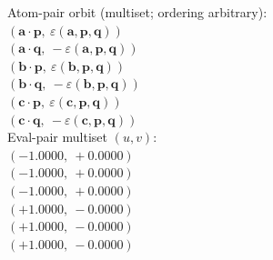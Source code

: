 \documentclass[a4paper,11pt]{article}
\newcommand{\pdcegfomjfhook}[2]{\mathbf{#1} \cdot \mathbf{#2}}
\newcommand{\kblbmcpggoncpf}[3]{\varepsilon(\mathbf{#1},\mathbf{#2},\mathbf{#3})}
\begin{document}
\quad Atom-pair orbit (multiset; ordering arbitrary):\\
$(\pdcegfomjfhook{a}{p},\ \kblbmcpggoncpf{a}{p}{q})$\\
$(\pdcegfomjfhook{a}{q},\ -\kblbmcpggoncpf{a}{p}{q})$\\
$(\pdcegfomjfhook{b}{p},\ \kblbmcpggoncpf{b}{p}{q})$\\
$(\pdcegfomjfhook{b}{q},\ -\kblbmcpggoncpf{b}{p}{q})$\\
$(\pdcegfomjfhook{c}{p},\ \kblbmcpggoncpf{c}{p}{q})$\\
$(\pdcegfomjfhook{c}{q},\ -\kblbmcpggoncpf{c}{p}{q})$\\
\quad Eval-pair multiset $(u, v)$:\\
$(-1.0000,\ +0.0000)$\\
$(-1.0000,\ +0.0000)$\\
$(-1.0000,\ +0.0000)$\\
$(+1.0000,\ -0.0000)$\\
$(+1.0000,\ -0.0000)$\\
$(+1.0000,\ -0.0000)$\\
\end{document}
